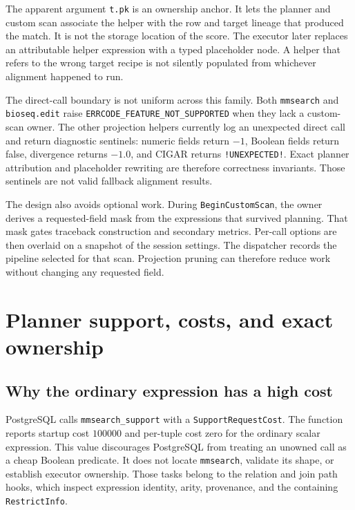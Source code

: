 The apparent argument \texttt{t.pk} is an ownership anchor.  It lets the
planner and custom scan associate the helper with the row and target lineage
that produced the match.  It is not the storage location of the score.  The
executor later replaces an attributable helper expression with a typed
placeholder node.  A helper that refers to the wrong target recipe is not
silently populated from whichever alignment happened to run.

The direct-call boundary is not uniform across this family.  Both
\texttt{mmsearch} and \texttt{bioseq.edit} raise
\texttt{ERRCODE\_FEATURE\_NOT\_SUPPORTED} when they lack a custom-scan owner.
The other projection helpers currently log an unexpected direct call and
return diagnostic sentinels: numeric fields return \(-1\), Boolean fields
return false, divergence returns \(-1.0\), and CIGAR returns
\texttt{!UNEXPECTED!}.  Exact planner attribution and placeholder rewriting
are therefore correctness invariants.  Those sentinels are not valid fallback
alignment results.

The design also avoids optional work.  During \texttt{BeginCustomScan}, the
owner derives a requested-field mask from the expressions that survived
planning.  That mask gates traceback construction and secondary metrics.
Per-call options are then overlaid on a snapshot of the session settings.
The dispatcher records the pipeline selected for that scan.  Projection
pruning can therefore reduce work without changing any requested field.

\section{Planner support, costs, and exact ownership}
\label{sec:planner-support-and-ownership}

\subsection{Why the ordinary expression has a high cost}

PostgreSQL calls \texttt{mmsearch\_support} with a
\texttt{SupportRequestCost}.  The function reports startup cost \(100000\)
and per-tuple cost zero for the ordinary scalar expression.  This value
discourages PostgreSQL from treating an unowned call as a cheap Boolean
predicate.  It does not locate \texttt{mmsearch}, validate its shape, or
establish executor ownership.  Those tasks belong to the relation and join
path hooks, which inspect expression identity, arity, provenance, and the
containing \texttt{RestrictInfo}.

